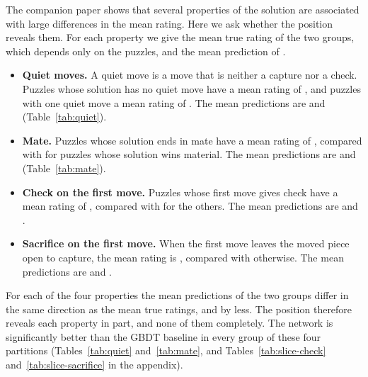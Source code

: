 \documentclass[11pt]{article}
\begin{document}
The companion paper shows that several properties of the solution are
associated with large differences in the mean rating. Here we ask whether the
position reveals them. For each property we give the mean true rating of the
two groups, which depends only on the puzzles, and the mean prediction of
.
\begin{itemize}
\item \textbf{Quiet moves.} A quiet move is a move that is neither a capture
nor a check. Puzzles whose solution has no quiet move have a mean rating of
, and puzzles with one quiet move a mean rating of
. The mean predictions are
 and 
(Table~\ref{tab:quiet}).
\item \textbf{Mate.} Puzzles whose solution ends in mate have a mean rating
of , compared with  for
puzzles whose solution wins material. The mean predictions are
 and 
(Table~\ref{tab:mate}).
\item \textbf{Check on the first move.} Puzzles whose first move gives check
have a mean rating of , compared with
 for the others. The mean predictions are
 and .
\item \textbf{Sacrifice on the first move.} When the first move leaves the
moved piece open to capture, the mean rating is
, compared with
 otherwise. The mean predictions are
 and
.
\end{itemize}
For each of the four properties the mean predictions of the two groups
differ in the same direction as the mean true ratings, and by less. The
position therefore reveals each property in part, and none of them
completely. The network is significantly better than the GBDT baseline in
every group of these four partitions (Tables~\ref{tab:quiet}
and~\ref{tab:mate}, and Tables~\ref{tab:slice-check}
and~\ref{tab:slice-sacrifice} in the appendix).

\begin{table}[htbp]\centering\footnotesize
{}
\caption{Test-set results by the number of quiet moves (neither captures nor
checks) among the solver's moves, which no model receives.}
\label{tab:quiet}
\end{table}
\end{document}
